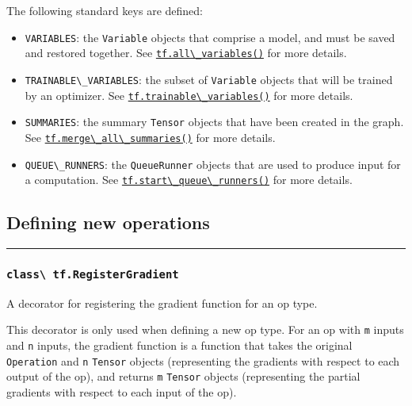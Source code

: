 The following standard keys are defined:

\begin{itemize}
\tightlist
\item
  \lstinline{VARIABLES}: the \lstinline{Variable} objects that comprise a
  model, and must be saved and restored together. See
  \href{../../api_docs/python/state_ops.md\#all_variables}{\lstinline{tf.all\_variables()}}
  for more details.
\item
  \lstinline{TRAINABLE\_VARIABLES}: the subset of \lstinline{Variable} objects
  that will be trained by an optimizer. See
  \href{../../api_docs/python/state_ops.md\#trainable_variables}{\lstinline{tf.trainable\_variables()}}
  for more details.
\item
  \lstinline{SUMMARIES}: the summary \lstinline{Tensor} objects that have been
  created in the graph. See
  \href{../../api_docs/python/train.md\#merge_all_summaries}{\lstinline{tf.merge\_all\_summaries()}}
  for more details.
\item
  \lstinline{QUEUE\_RUNNERS}: the \lstinline{QueueRunner} objects that are
  used to produce input for a computation. See
  \href{../../api_docs/python/train.md\#start_queue_runners}{\lstinline{tf.start\_queue\_runners()}}
  for more details.
\end{itemize}

\subsection{Defining new operations }\label{defining-new-operations}

\begin{center}\rule{0.5\linewidth}{\linethickness}\end{center}

\subsubsection{\texorpdfstring{\lstinline{class\ tf.RegisterGradient}
}{class tf.RegisterGradient }}\label{class-tf.registergradient}

A decorator for registering the gradient function for an op type.

This decorator is only used when defining a new op type. For an op with
\lstinline{m} inputs and \lstinline{n} inputs, the gradient function is a
function that takes the original \lstinline{Operation} and \lstinline{n}
\lstinline{Tensor} objects (representing the gradients with respect to each
output of the op), and returns \lstinline{m} \lstinline{Tensor} objects
(representing the partial gradients with respect to each input of the
op).

